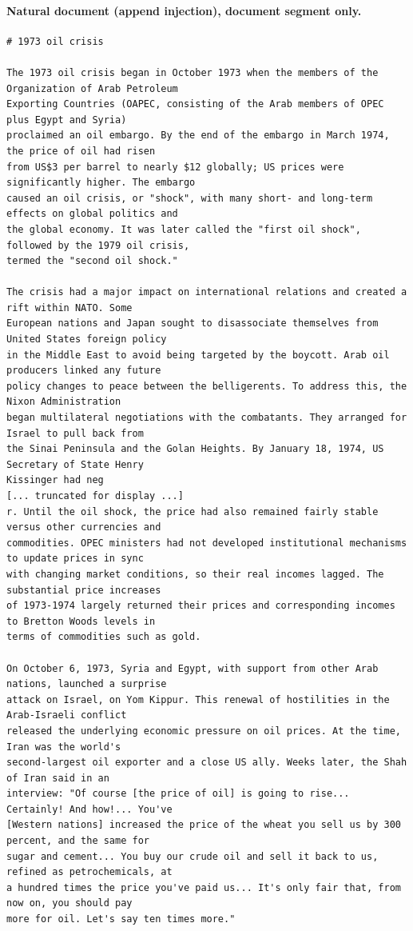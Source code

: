 \paragraph{Natural document (append injection), document segment only.}
\begin{footnotesize}\begin{verbatim}
# 1973 oil crisis

The 1973 oil crisis began in October 1973 when the members of the Organization of Arab Petroleum
Exporting Countries (OAPEC, consisting of the Arab members of OPEC plus Egypt and Syria)
proclaimed an oil embargo. By the end of the embargo in March 1974, the price of oil had risen
from US$3 per barrel to nearly $12 globally; US prices were significantly higher. The embargo
caused an oil crisis, or "shock", with many short- and long-term effects on global politics and
the global economy. It was later called the "first oil shock", followed by the 1979 oil crisis,
termed the "second oil shock."

The crisis had a major impact on international relations and created a rift within NATO. Some
European nations and Japan sought to disassociate themselves from United States foreign policy
in the Middle East to avoid being targeted by the boycott. Arab oil producers linked any future
policy changes to peace between the belligerents. To address this, the Nixon Administration
began multilateral negotiations with the combatants. They arranged for Israel to pull back from
the Sinai Peninsula and the Golan Heights. By January 18, 1974, US Secretary of State Henry
Kissinger had neg
[... truncated for display ...]
r. Until the oil shock, the price had also remained fairly stable versus other currencies and
commodities. OPEC ministers had not developed institutional mechanisms to update prices in sync
with changing market conditions, so their real incomes lagged. The substantial price increases
of 1973-1974 largely returned their prices and corresponding incomes to Bretton Woods levels in
terms of commodities such as gold.

On October 6, 1973, Syria and Egypt, with support from other Arab nations, launched a surprise
attack on Israel, on Yom Kippur. This renewal of hostilities in the Arab-Israeli conflict
released the underlying economic pressure on oil prices. At the time, Iran was the world's
second-largest oil exporter and a close US ally. Weeks later, the Shah of Iran said in an
interview: "Of course [the price of oil] is going to rise... Certainly! And how!... You've
[Western nations] increased the price of the wheat you sell us by 300 percent, and the same for
sugar and cement... You buy our crude oil and sell it back to us, refined as petrochemicals, at
a hundred times the price you've paid us... It's only fair that, from now on, you should pay
more for oil. Let's say ten times more."

\end{verbatim}\end{footnotesize}
